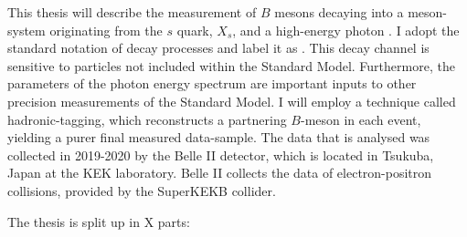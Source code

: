 This thesis will describe the measurement of $B$ mesons decaying into a meson-system originating from the $s$ quark, $X_s$, and a high-energy photon \g.
I adopt the standard notation of decay processes and label it as \BtoXsgamma.
This decay channel is sensitive to particles not included within the Standard Model. 
Furthermore, the parameters of the photon energy spectrum are important inputs to other precision measurements of the Standard Model.
I will employ a technique called hadronic-tagging, which reconstructs a partnering $B$-meson in each event, yielding a purer final measured data-sample.
The data that is analysed was collected in 2019-2020 by the Belle II detector, which is located in Tsukuba, Japan at the KEK laboratory.
Belle II collects the data of electron-positron collisions, provided by the SuperKEKB collider.


The thesis is split up in X parts:

